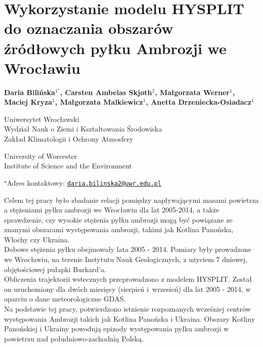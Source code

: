 \documentclass[\main/boa.tex]{subfiles}
\begin{document}
\section{Wykorzystanie modelu HYSPLIT do oznaczania obszarów źródłowych pyłku Ambrozji we Wrocławiu}

\begin{center}
  {\bf {} Daria Bilińska$^{1^\star}$,  Carsten Ambelas Skjøth$^{2}$,  Małgorzata Werner$^{1}$,  Maciej Kryza$^{1}$,  Małgorzata Malkiewicz$^{1}$,  Anetta Drzeniecka-Osiadacz$^{1}$}
\end{center}

\vskip 0.3cm

\begin{affiliations}
\begin{enumerate}
\begin{minipage}{0.915\textwidth}
\centering
\item Uniwersytet Wrocławski\\ Wydział Nauk o Ziemi i Kształtowania Środowiska\\Zakład Klimatologii i Ochrony Atmosfery\\[-2pt]
\item University of Worcester\\ Institute of Science and the Environment\\[-2pt]
\end{minipage}
\end{enumerate}
$^\star$Adres kontaktowy: \href{mailto:daria.bilinska2@uwr.edu.pl}{\nolinkurl{daria.bilinska2@uwr.edu.pl}}\\
\end{affiliations}

\vskip 0.5cm


\vskip 0.5cm

Celem tej pracy było zbadanie relacji pomiędzy napływającymi masami powietrza a stężeniami pyłku ambrozji we Wrocławiu dla lat 2005-2014, a także sprawdzenie, czy wysokie stężenia pyłku ambrozji mogą być powiązane ze znanymi obszarami występowania ambrozji, takimi jak Kotlina Panońska, Włochy czy Ukraina.\\
Dobowe stężenia pyłku obejmowały lata 2005 - 2014. Pomiary były prowadzone we Wrocławiu, na terenie Instytutu Nauk Geologicznych, z użyciem 7 dniowej, objętościowej pułapki Burkard’a. \\
Obliczenia trajektorii wstecznych przeprowadzono z modelem HYSPLIT. Został on uruchomiony dla dwóch miesięcy (sierpień i wrzesień) dla lat 2005 - 2014, w oparciu o dane meteorologiczne GDAS.\\
Na podstawie tej pracy, potwierdzono istnienie rozpoznanych wcześniej centrów występowania Ambrozji takich jak Kotlina Panońska i Ukraina. Obszary Kotliny Panońskiej i Ukrainy powodują epizody występowania pyłku ambrozji w powietrzu nad południowo-zachodnią Polską.
\end{document}
